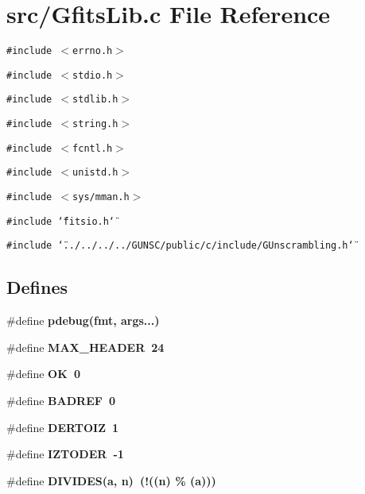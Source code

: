\section{src/Gfits\-Lib.c File Reference}
\label{GfitsLib_8c}
{\tt \#include $<$errno.h$>$}\par
{\tt \#include $<$stdio.h$>$}\par
{\tt \#include $<$stdlib.h$>$}\par
{\tt \#include $<$string.h$>$}\par
{\tt \#include $<$fcntl.h$>$}\par
{\tt \#include $<$unistd.h$>$}\par
{\tt \#include $<$sys/mman.h$>$}\par
{\tt \#include \char`\"{}fitsio.h\char`\"{}}\par
{\tt \#include \char`\"{}../../../../GUNSC/public/c/include/GUnscrambling.h\char`\"{}}\par
\subsection*{Defines}
\begin{CompactItemize}
\item 
\#define \bf{pdebug}(fmt, args...)
\item 
\#define \bf{MAX\_\-HEADER}~24
\item 
\#define \bf{OK}~0
\item 
\#define \bf{BADREF}~0
\item 
\#define \bf{DERTOIZ}~1
\item 
\#define \bf{IZTODER}~-1
\item 
\#define \bf{DIVIDES}(a, \bf{n})~(!((\bf{n}) \% (a)))
\end{CompactItemize}
